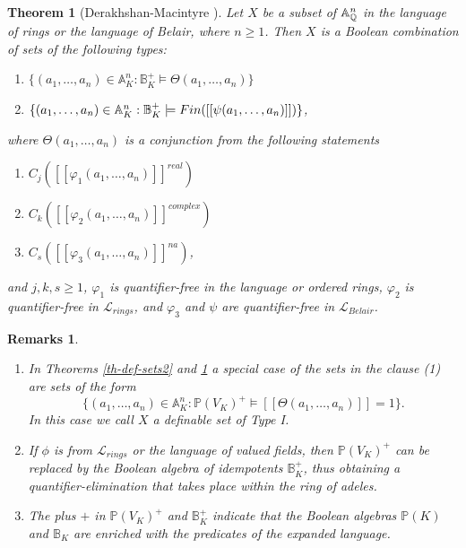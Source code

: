 \documentclass[12pt]{amsart}
\def\A{\mathbb{A}}
\def\B{\mathbb{B}}
\def\P{\mathbb{P}}
\def\cL{\mathcal{L}}
\def\Q{\mathbb{Q}}
\def\cL{\mathcal{L}}
\newtheorem{thm}{Theorem}[section]
\newtheorem{remarks}{Remarks}[section]
\numberwithin{equation}{section}
\begin{document}
\begin{thm}[Derakhshan-Macintyre {\cite{DM-ad}}]\label{th-def-sets} Let 
$X$ be a subset of 
$\Bbb A_{\Q}^n$ in the language of rings or the language of Belair, where $n\geq 1$. Then $X$ is a Boolean 
combination of sets of the following types:
\begin{enumerate}
\item $\{(a_1,\dots,a_n)\in \A_K^n: \B_K^+\models \Theta(a_1,\dots,a_n)\}$
\item $\{(a_1,\dots,a_n)\in \Bbb A_K^n: \B_K^+\models Fin([[\psi(a_1,\dots,a_n)]])\}$,
\end{enumerate}
where $\Theta(a_1,\dots,a_n)$ is a conjunction from the following statements
\begin{enumerate}
\item $C_j([[\varphi_1(a_1,\dots,a_n)]]^{real})$
\item $C_k([[\varphi_2(a_1,\dots,a_n)]]^{complex})$
\item $C_s([[\varphi_3(a_1,\dots,a_n)]]^{na})$,
\end{enumerate}
and $j,k,s\geq 1$, $\varphi_1$ is quantifier-free in the language or ordered rings, 
$\varphi_2$ is quantifier-free in $\cL_{rings}$, and
$\varphi_3$ and $\psi$ are quantifier-free in $\cL_{Belair}$.
\end{thm}

\begin{remarks}\label{typeI}\noindent\begin{enumerate}
\item In Theorems \ref{th-def-sets2} and \ref{th-def-sets} a special case of the sets in the clause (1) are sets of the form
$$\{(a_1,\dots,a_n)\in \A_K^n: \P(V_K)^+\models [[\Theta(a_1,\dots,a_n)]]=1\}.$$
In this case we call $X$ a definable set of Type I.
\item If $\phi$ is from $\cL_{rings}$ or the language of valued fields, then $\P(V_K)^+$ can be replaced by the Boolean algebra of idempotents $\B_K^+$, thus obtaining a quantifier-elimination 
that takes place within the ring of adeles.
\item The plus $+$ in $\P(V_K)^+$ and $\B_K^+$ indicate that the Boolean algebras $\P(K)$ and $\B_K$ are enriched with the predicates of the expanded language.
\end{enumerate}
\end{remarks}
\end{document}
